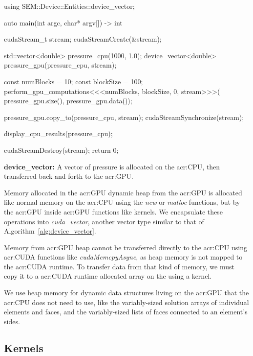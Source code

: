 \begin{algorithm}[H]
    \begin{cuda}
		using SEM::Device::Entities::device_vector;

		auto main(int argc, char* argv[]) -> int {
			cudaStream_t stream;
			cudaStreamCreate(&stream); 

			std::vector<double> pressure_cpu(1000, 1.0);
			device_vector<double> pressure_gpu(pressure_cpu, stream);

			const numBlocks = 10;
			const blockSize = 100;
			perform_gpu_computations<<<numBlocks, blockSize, 0, stream>>>(
				pressure_gpu.size(), pressure_gpu.data());
			
			pressure_gpu.copy_to(pressure_cpu, stream);
			cudaStreamSynchronize(stream);

			display_cpu_results(pressure_cpu);

			cudaStreamDestroy(stream);
			return 0;
		}\end{cuda}
\caption{\textbf{device\_vector:} A vector of pressure is allocated on the \acrshort{acr:CPU}, then transferred back and forth to the \acrshort{acr:GPU}.}\label{alg:device_vector}
\end{algorithm}

Memory allocated in the \acrshort{acr:GPU} dynamic heap from the \acrshort{acr:GPU} is allocated
like normal memory on the \acrshort{acr:CPU} using the \textit{new} or \textit{malloc} functions,
but by the \acrshort{acr:GPU} inside \acrshort{acr:GPU} functions like kernels. We encapsulate these
operations into \textit{cuda\_vector}, another vector type similar to that of
Algorithm~\ref{alg:device_vector}.

Memory from \acrshort{acr:GPU} heap cannot be transferred directly to the \acrshort{acr:CPU} using
\acrshort{acr:CUDA} functions like \textit{cudaMemcpyAsync}, as heap memory is not mapped to the
\acrshort{acr:CUDA} runtime. To transfer data from that kind of memory, we must copy it to a
\acrshort{acr:CUDA} runtime allocated array on the using a kernel.

We use heap memory for dynamic data structures living on the \acrshort{acr:GPU} that the
\acrshort{acr:CPU} does not need to use, like the variably-sized solution arrays of individual
elements and faces, and the variably-sized lists of faces connected to an element's sides.

\subsection{Kernels}\label{subsection:graphics_processing_units:implementation:kernels}

